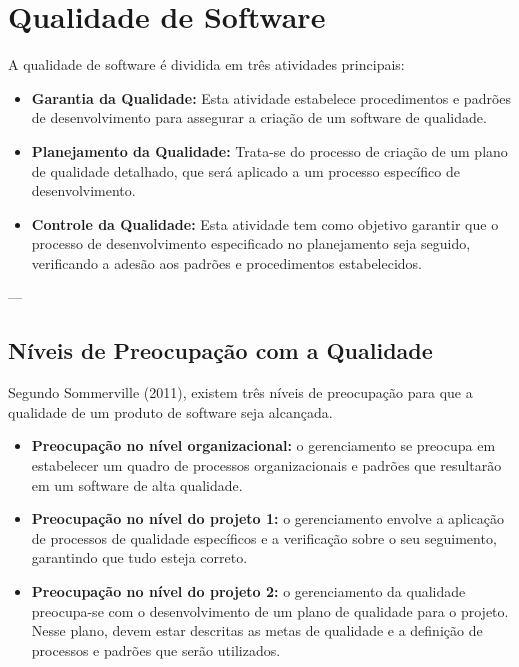 \documentclass{article}
\begin{document}
\section*{Qualidade de Software}

A qualidade de software é dividida em três atividades principais:

\begin{itemize}
    \item \textbf{Garantia da Qualidade:} Esta atividade estabelece procedimentos e padrões de desenvolvimento para assegurar a criação de um software de qualidade.

    \item \textbf{Planejamento da Qualidade:} Trata-se do processo de criação de um plano de qualidade detalhado, que será aplicado a um processo específico de desenvolvimento.

    \item \textbf{Controle da Qualidade:} Esta atividade tem como objetivo garantir que o processo de desenvolvimento especificado no planejamento seja seguido, verificando a adesão aos padrões e procedimentos estabelecidos.
\end{itemize}

---

\subsection*{Níveis de Preocupação com a Qualidade}

Segundo Sommerville (2011), existem três níveis de preocupação para que a qualidade de um produto de software seja alcançada.

\begin{itemize}
    \item \textbf{Preocupação no nível organizacional:} o gerenciamento se preocupa em estabelecer um quadro de processos organizacionais e padrões que resultarão em um software de alta qualidade.

    \item \textbf{Preocupação no nível do projeto 1:} o gerenciamento envolve a aplicação de processos de qualidade específicos e a verificação sobre o seu seguimento, garantindo que tudo esteja correto.

    \item \textbf{Preocupação no nível do projeto 2:} o gerenciamento da qualidade preocupa-se com o desenvolvimento de um plano de qualidade para o projeto. Nesse plano, devem estar descritas as metas de qualidade e a definição de processos e padrões que serão utilizados.
\end{itemize}
\end{document}
